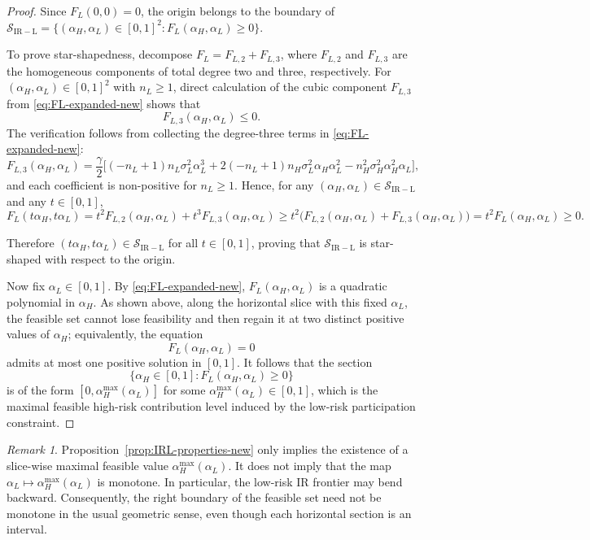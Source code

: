 \documentclass[a4paper,12pt]{article}
\theoremstyle{definition}
\theoremstyle{remark}
\newtheorem{remark}[theorem]{Remark}
\newcommand{\1}{\mathbf{1}}
\begin{document}
\begin{proof}
Since \(F_L(0,0)=0\), the origin belongs to the boundary of
\(\mathcal S_{\mathrm{IR-L}}=\{(\alpha_H,\alpha_L)\in[0,1]^2:F_L(\alpha_H,\alpha_L)\ge 0\}\).

To prove star-shapedness, decompose \(F_L=F_{L,2}+F_{L,3}\), where
\(F_{L,2}\) and \(F_{L,3}\) are the homogeneous components of total degree two
and three, respectively. For \((\alpha_H,\alpha_L)\in[0,1]^2\) with \(n_L\ge 1\),
direct calculation of the cubic component \(F_{L,3}\) from \eqref{eq:FL-expanded-new} shows that
\[
F_{L,3}(\alpha_H,\alpha_L)\le 0.
\]
The verification follows from collecting the degree-three terms in \eqref{eq:FL-expanded-new}:
\[
F_{L,3}(\alpha_H,\alpha_L) = \frac{\gamma}{2}\Big[(-n_L+1)n_L\sigma_L^2\alpha_L^3 + 2(-n_L+1)n_H\sigma_L^2\alpha_H\alpha_L^2 - n_H^2\sigma_H^2\alpha_H^2\alpha_L\Big],
\]
and each coefficient is non-positive for \(n_L\ge 1\). Hence, for any \((\alpha_H,\alpha_L)\in \mathcal S_{\mathrm{IR-L}}\) and any
\(t\in[0,1]\),
\[
F_L(t\alpha_H,t\alpha_L)
= t^2 F_{L,2}(\alpha_H,\alpha_L)+t^3 F_{L,3}(\alpha_H,\alpha_L)
\ge t^2\bigl(F_{L,2}(\alpha_H,\alpha_L)+F_{L,3}(\alpha_H,\alpha_L)\bigr)
= t^2 F_L(\alpha_H,\alpha_L)\ge 0.
\]

Therefore \((t\alpha_H,t\alpha_L)\in\mathcal S_{\mathrm{IR-L}}\) for all
\(t\in[0,1]\), proving that \(\mathcal S_{\mathrm{IR-L}}\) is star-shaped with
respect to the origin.

Now fix \(\alpha_L\in[0,1]\). By \eqref{eq:FL-expanded-new},
\(F_L(\alpha_H,\alpha_L)\) is a quadratic polynomial in \(\alpha_H\). As shown
above, along the horizontal slice with this fixed \(\alpha_L\), the feasible set
cannot lose feasibility and then regain it at two distinct positive values of
\(\alpha_H\); equivalently, the equation
\[
F_L(\alpha_H,\alpha_L)=0
\]
admits at most one positive solution in \([0,1]\). It follows that the section
\[
\{\alpha_H\in[0,1]: F_L(\alpha_H,\alpha_L)\ge 0\}
\]
is of the form \([0,\alpha_H^{\max}(\alpha_L)]\) for some
\(\alpha_H^{\max}(\alpha_L)\in[0,1]\), which is the maximal feasible
high-risk contribution level induced by the low-risk participation constraint.
\end{proof}

\begin{remark}\label{rem:backward-bending}
Proposition~\ref{prop:IRL-properties-new} only implies the existence of a
slice-wise maximal feasible value \(\alpha_H^{\max}(\alpha_L)\). It does not
imply that the map \(\alpha_L\mapsto \alpha_H^{\max}(\alpha_L)\) is monotone.
In particular, the low-risk IR frontier may bend backward. Consequently, the
right boundary of the feasible set need not be monotone in the usual geometric
sense, even though each horizontal section is an interval.
\end{remark}
\end{document}
